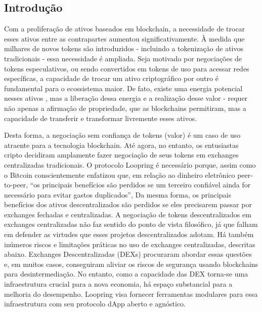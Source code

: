 \documentclass[UTF8,nofonts]{article}
\begin{document}
\begin{multicols}{2}
\section{Introdução\label{sec:introduction}}

Com a proliferação de ativos baseados em blockchain, a necessidade de trocar esses ativos entre as contrapartes aumentou significativamente. À medida que milhares de novos tokens são introduzidos - incluindo a tokenização de ativos tradicionais - essa necessidade é ampliada. Seja motivado por negociações de tokens especulativos, ou sendo convertidos em tokens de uso para acessar redes específicas, a capacidade de trocar um ativo criptográfico por outro é fundamental para o ecossistema maior. De fato, existe uma energia potencial nesses ativos \cite{desotocapital}, mas a liberação dessa energia e a realização desse valor - requer não apenas a afirmação de propriedade, que as blockchains permitiram, mas a capacidade de transferir e transformar livremente esses ativos.
 
Desta forma, a negociação sem confiança de tokens (valor) é um caso de uso atraente para a tecnologia blockchain. 
Até agora, no entanto, os entusiastas cripto decidiram amplamente fazer negociação de seus tokens em exchanges centralizadas tradicionais. O protocolo Loopring é necessário porque, assim como o Bitcoin \cite{nakamoto2008bitcoin} conscientemente enfatizou que, em relação ao dinheiro eletrônico peer-to-peer, \enquote{os principais benefícios são perdidos se um terceiro confiável ainda for necessário para evitar gastos duplicados}, Da mesma forma, os principais benefícios dos ativos descentralizados são perdidos se eles precisarem passar por exchanges fechadas e centralizadas. 
A negociação de tokens descentralizados em exchanges centralizadas não faz sentido do ponto de vista filosófico, já que falham em defender as virtudes que esses projetos descentralizados adotam. Há também inúmeros riscos e limitações práticas no uso de exchanges centralizadas, descritas abaixo. Exchanges Descentralizadas (DEXs) \cite{schuh2015bitshares} \cite{bancor} \cite{kyber} procuraram abordar essas questões e, em muitos casos, conseguiram aliviar os riscos de segurança usando blockchains para desintermediação. No entanto, como a capacidade das DEX torna-se uma infraestrutura crucial para a nova economia, há espaço substancial para a melhoria do desempenho. Loopring visa fornecer ferramentas modulares para essa infraestrutura com seu protocolo dApp aberto e agnóstico.


\end{multicols}
\end{document}
